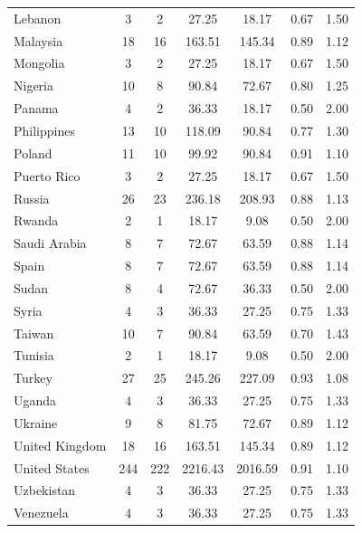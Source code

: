 \documentclass{article}
\theoremstyle{definition}
\begin{document}
\begin{table}[H]
\begin{tabular}{l|cccccc}
Lebanon &   3 &   2 & 27.25 & 18.17 & 0.67 & 1.50 \\
Malaysia &  18 &  16 & 163.51 & 145.34 & 0.89 & 1.12 \\
Mongolia &   3 &   2 & 27.25 & 18.17 & 0.67 & 1.50 \\
Nigeria &  10 &   8 & 90.84 & 72.67 & 0.80 & 1.25 \\
Panama &   4 &   2 & 36.33 & 18.17 & 0.50 & 2.00 \\
Philippines &  13 &  10 & 118.09 & 90.84 & 0.77 & 1.30 \\
Poland &  11 &  10 & 99.92 & 90.84 & 0.91 & 1.10 \\
Puerto Rico &   3 &   2 & 27.25 & 18.17 & 0.67 & 1.50 \\
Russia &  26 &  23 & 236.18 & 208.93 & 0.88 & 1.13 \\
Rwanda &   2 &   1 & 18.17 & 9.08 & 0.50 & 2.00 \\
Saudi Arabia &   8 &   7 & 72.67 & 63.59 & 0.88 & 1.14 \\
Spain &   8 &   7 & 72.67 & 63.59 & 0.88 & 1.14 \\
Sudan &   8 &   4 & 72.67 & 36.33 & 0.50 & 2.00 \\
Syria &   4 &   3 & 36.33 & 27.25 & 0.75 & 1.33 \\
Taiwan &  10 &   7 & 90.84 & 63.59 & 0.70 & 1.43 \\
Tunisia &   2 &   1 & 18.17 & 9.08 & 0.50 & 2.00 \\
Turkey &  27 &  25 & 245.26 & 227.09 & 0.93 & 1.08 \\
Uganda &   4 &   3 & 36.33 & 27.25 & 0.75 & 1.33 \\
Ukraine &   9 &   8 & 81.75 & 72.67 & 0.89 & 1.12 \\
United Kingdom &  18 &  16 & 163.51 & 145.34 & 0.89 & 1.12 \\
United States & 244 & 222 & 2216.43 & 2016.59 & 0.91 & 1.10 \\
Uzbekistan &   4 &   3 & 36.33 & 27.25 & 0.75 & 1.33 \\
Venezuela &   4 &   3 & 36.33 & 27.25 & 0.75 & 1.33 \\
\end{tabular}
\label{table:weights}
\end{table}
\end{document}
